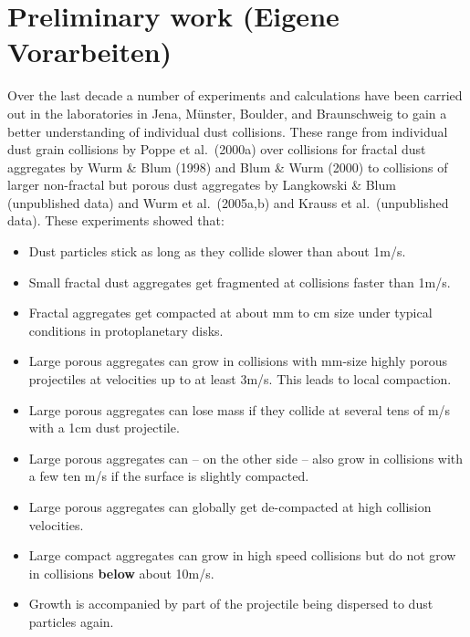 \section{Preliminary work (Eigene Vorarbeiten)}

Over the last decade a number of experiments and calculations have been
carried out in the laboratories in Jena, M\"unster, Boulder, and
Braunschweig to gain a better understanding of individual dust
collisions. These range from individual dust grain collisions by Poppe et
al.~(2000a) over collisions for fractal dust aggregates by Wurm \& Blum
(1998) and Blum \& Wurm (2000) to collisions of larger non-fractal but
porous dust aggregates by Langkowski \& Blum (unpublished data) and Wurm et
al.~(2005a,b) and Krauss et al.~(unpublished data). These experiments showed
that:

\begin{itemize}

\item Dust particles stick as long as they collide slower than about 1m/s.

\item Small fractal dust aggregates get fragmented at collisions faster 
  than 1m/s.

\item Fractal aggregates get compacted at about mm to cm size under 
  typical conditions in protoplanetary disks.

\item Large porous aggregates can grow in collisions with mm-size highly 
  porous projectiles at velocities up to at least 3m/s. This leads to local
  compaction.

\item Large porous aggregates can lose mass if they collide at
  several tens of m/s with a 1cm dust projectile.

\item Large porous aggregates can -- on the other side -- also
  grow in collisions with a few ten m/s if the surface is slightly
  compacted.

\item Large porous aggregates can globally get de-compacted at high 
  collision velocities.

\item Large compact aggregates can grow in high speed collisions 
  but do not grow in collisions {\bf below} about 10m/s.

\item Growth is accompanied by part of the projectile being dispersed 
  to dust particles again.

\end{itemize}

